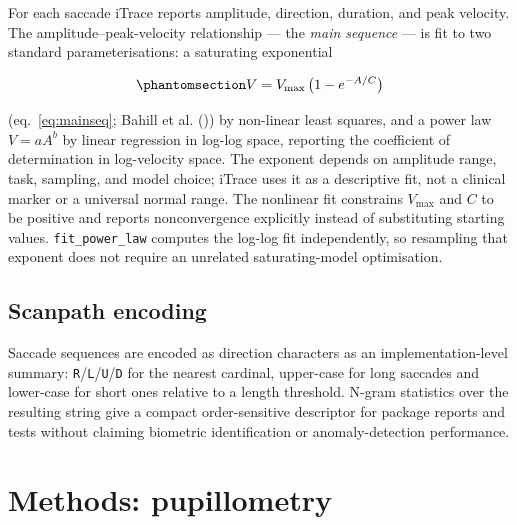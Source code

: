 \documentclass[
]{article}
\begin{document}
For each saccade iTrace reports amplitude, direction, duration, and peak
velocity. The amplitude--peak-velocity relationship --- the \emph{main
sequence} --- is fit to two standard parameterisations: a saturating
exponential

\begin{equation}\protect\phantomsection\label{eq:mainseq}{V = V_{\max}\,\big(1 - e^{-A/C}\big)}\end{equation}

(eq.~\ref{eq:mainseq}; Bahill et al.
()) by non-linear least squares, and
a power law \(V = aA^b\) by linear regression in log-log space,
reporting the coefficient of determination in log-velocity space. The
exponent depends on amplitude range, task, sampling, and model choice;
iTrace uses it as a descriptive fit, not a clinical marker or a
universal normal range. The nonlinear fit constrains \(V_{\max}\) and
\(C\) to be positive and reports nonconvergence explicitly instead of
substituting starting values. \texttt{fit\_power\_law} computes the
log-log fit independently, so resampling that exponent does not require
an unrelated saturating-model optimisation.

\subsection{Scanpath encoding}\label{scanpath-encoding}

Saccade sequences are encoded as direction characters as an
implementation-level summary:
\texttt{R}/\texttt{L}/\texttt{U}/\texttt{D} for the nearest cardinal,
upper-case for long saccades and lower-case for short ones relative to a
length threshold. N-gram statistics over the resulting string give a
compact order-sensitive descriptor for package reports and tests without
claiming biometric identification or anomaly-detection performance.

\section{Methods: pupillometry}\label{sec:pupillometry}
\end{document}
